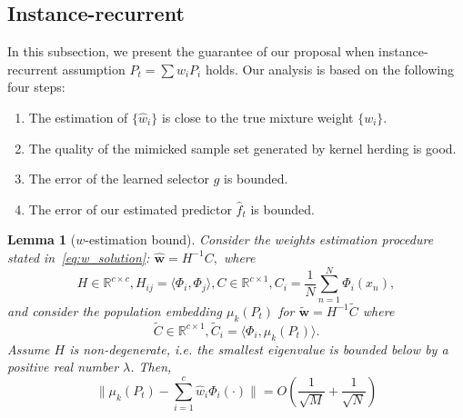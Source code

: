 \documentclass[paper=letter, fontsize=20pt]{article}
\newtheorem{Lemma}{Lemma}
\begin{document}
\subsection{Instance-recurrent}
In this subsection, we present the guarantee of our proposal when instance-recurrent assumption $P_t=\sum w_i P_i$ holds. Our analysis is based on the following four steps:
\begin{enumerate}
  \item The estimation of $\{\widehat{w}_i\}$ is close to the true mixture weight $\{w_i\}$.
  \item The quality of the mimicked sample set generated by kernel herding is good.
  \item The error of the learned selector $g$ is bounded.
  \item The error of our estimated predictor $\widehat{f}_t$ is bounded.
\end{enumerate}
\begin{Lemma}[$w$-estimation bound]\label{lem:w_estimation}
Consider the weights estimation procedure stated in~\eqref{eq:w_solution}: $\widehat{\bm{w}} = H^{-1}C,$
where
\begin{equation*}
  H\in \mathbb{R}^{c\times c},H_{ij}=\langle \Phi_i, \Phi_j\rangle, C\in \mathbb{R}^{c\times 1},C_i=\frac{1}{N}\sum_{n=1}^N \Phi_i(x_n),
\end{equation*}
and consider the population embedding $\mu_k(P_t)$ for $\widetilde{\bm{w}} = H^{-1}\widetilde{C}$
where
$$\widetilde{C}\in \mathbb{R}^{c\times 1},\widetilde{C}_i=\langle \Phi_i, \mu_k(P_t) \rangle.$$
Assume $H$ is non-degenerate, i.e. the smallest eigenvalue is bounded below by a positive real number $\lambda$. Then,
$$\|\mu_k(P_t) - \sum_{i=1}^c \widehat{w}_i\Phi_i(\cdot) \| = O(\frac{1}{\sqrt{M}} + \frac{1}{\sqrt{N}})$$
\end{Lemma}
\end{document}
